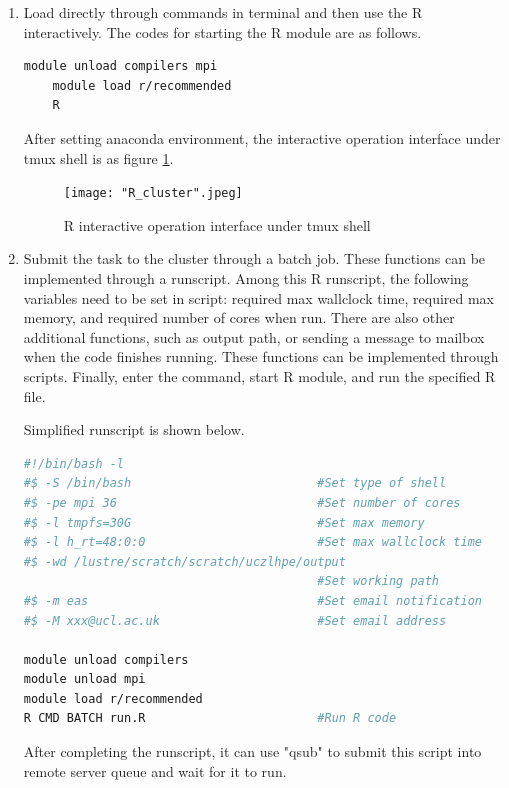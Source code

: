 \documentclass[a4paper,12pt,titlepage]{article} %
\numberwithin{equation}{section}  %
\begin{document}
	\begin{enumerate}

	\item Load directly through commands in terminal and then use the R interactively. The codes for starting the R module are as follows.
	
	
	\begin{lstlisting}[language=sh]
	module unload compilers mpi
	module load r/recommended
	R
	\end{lstlisting}
	
	After setting anaconda environment, the interactive operation interface under tmux shell is as figure \ref{fig:R_cluster}.
	
	\begin{figure}[h]    %
	\centering           %
	\texttt{[image: "R\_cluster".jpeg]} %
	\vspace*{-0.25cm}    %
	\caption{R interactive operation interface under tmux shell}          %
	\label{fig:R_cluster}               %
	\end{figure}                        %
	
	
	\item Submit the task to the cluster through a batch job. These functions can be implemented through a runscript. Among this R runscript, the following variables need to be set in script:  required max wallclock time, required max memory, and required number of cores when run. There are also other additional functions, such as output path, or sending a message to mailbox when the code finishes running. These functions can be implemented through scripts. Finally, enter the command, start R module, and run the specified R file.
	
	Simplified runscript is shown below.
	
	\begin{lstlisting}[language=sh]
#!/bin/bash -l
#$ -S /bin/bash                          #Set type of shell
#$ -pe mpi 36                            #Set number of cores
#$ -l tmpfs=30G                          #Set max memory
#$ -l h_rt=48:0:0                        #Set max wallclock time
#$ -wd /lustre/scratch/scratch/uczlhpe/output
                                         #Set working path
#$ -m eas                                #Set email notification
#$ -M xxx@ucl.ac.uk                      #Set email address

module unload compilers
module unload mpi
module load r/recommended
R CMD BATCH run.R                        #Run R code
	\end{lstlisting}
	
After completing the runscript, it can use "qsub" to submit this script into remote server queue and wait for it to run.
	
	\end{enumerate}
	
\end{document}
